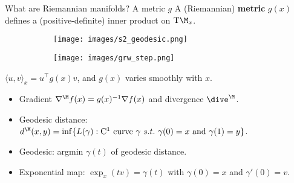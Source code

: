    
   \begin{frame}{What are Riemannian manifolds? A metric ${g}$}
   A (Riemannian) \textbf{metric} ${g}(x)$ defines a (positive-definite) inner product on $\mathrm{T}\M_x$.
   \begin{figure}
       \vspace{-2.5em}
       \centering
        \begin{subfigure}[t]{0.2\textwidth}
           \texttt{[image: images/s2\_geodesic.png]}
       \end{subfigure}
       \hspace{2em}
       \begin{subfigure}[t]{0.25\textwidth}
           \texttt{[image: images/grw\_step.png]}
       \end{subfigure}
       \vspace{-3.5em}
   \end{figure}
   \begin{center}
       $\langle u, v \rangle_x = u^\top g(x) v$, and  ${g}(x)$ varies smoothly with $x$.
   \end{center}
   \begin{itemize} [circle]
       \item Gradient $\nabla^\M f(x) = g(x)^{-1} \nabla f(x)$ and divergence $\dive^\M$.
       \item Geodesic distance: $d^\M(x,y) = \inf \{L(\gamma): \mathrm{C}^1 \text{ curve } \gamma \ s.t.\ \gamma(0)=x \text{ and } \gamma(1)=y\}$.
       \item Geodesic: argmin $\gamma(t)$ of geodesic distance.
       \item Exponential map: $\exp_x(tv) = \gamma(t)$ with $\gamma(0)=x$ and $\gamma'(0)=v$.
   \end{itemize}
   \end{frame}
   
   
   
